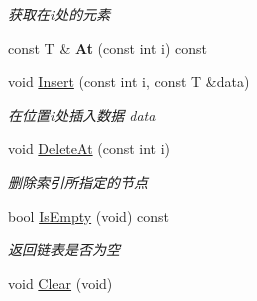 \begin{DoxyCompactItemize}
\begin{DoxyCompactList}\small\item\em 获取在i处的元素 \end{DoxyCompactList}\item 
\hypertarget{class_util_1_1_link_list_t_a102945173d8f6b7af8d60b9b1ea70749}{const T \& {\bfseries At} (const int i) const }\label{class_util_1_1_link_list_t_a102945173d8f6b7af8d60b9b1ea70749}

\item 
void \hyperlink{class_util_1_1_link_list_t_a5eec94fcd813720cbc1d1705386b44b6}{Insert} (const int i, const T \&data)
\begin{DoxyCompactList}\small\item\em 在位置i处插入数据 data \end{DoxyCompactList}\item 
void \hyperlink{class_util_1_1_link_list_t_a61b8ac3151b64b43d83a39e214ca2fcf}{Delete\-At} (const int i)
\begin{DoxyCompactList}\small\item\em 删除索引所指定的节点 \end{DoxyCompactList}\item 
bool \hyperlink{class_util_1_1_link_list_t_a8a6e3578116db560b1671d031f68acfe}{Is\-Empty} (void) const 
\begin{DoxyCompactList}\small\item\em 返回链表是否为空 \end{DoxyCompactList}\item 
\hypertarget{class_util_1_1_link_list_t_a756f91eb4237ffd79b6c4d04845ed1ea}{void \hyperlink{class_util_1_1_link_list_t_a756f91eb4237ffd79b6c4d04845ed1ea}{Clear} (void)}\label{class_util_1_1_link_list_t_a756f91eb4237ffd79b6c4d04845ed1ea}


\end{DoxyCompactItemize}

